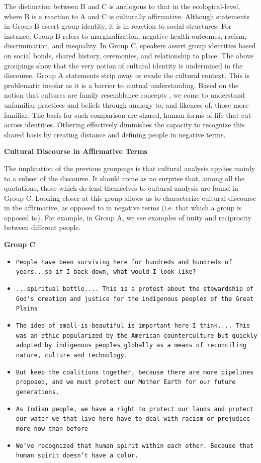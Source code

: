 The distinction between B and C is analogous to that in the ecological-level, where B is a reaction to A and C is culturally affirmative. Although statements in Group B assert group identity, it is in reaction to social structures. For instance, Group B refers to marginalization, negative health outcomes, racism, discrimination, and inequality. In Group C, speakers assert group identities based on social bonds, shared history, ceremonies, and relationship to place. 
The above groupings show that the very notion of cultural identity is undermined in the discourse. Group A statements strip away or evade the cultural context. This is problematic insofar as it is a barrier to mutual understanding. Based on the notion that cultures are family resemblance concepts \citep[10-11]{Frayne2017a}, we come to understand unfamiliar practices and beliefs through analogy to, and likeness of, those more familiar. The basis for such comparison are shared, human forms of life that cut across identities. Othering effectively diminishes the capacity to recognize this shared basis by creating distance and defining people in negative terms. 

\textbf{Cultural Discourse in Affirmative Terms }

The implication of the previous groupings is that cultural analysis applies mainly to a subset of the discourse. It should come as no surprise that, among all the quotations, those which do lend themselves to cultural analysis are found in Group C. Looking closer at this group allows us to characterize cultural discourse in the affirmative, as opposed to in negative terms (i.e. that which a group is opposed to). For example, in Group A, we see examples of unity and reciprocity between different people. 

\begin{footnotesize}
\textbf{Group C}
\begin{itemize}
\item[-] \texttt{People have been surviving here for hundreds and hundreds of years...so if I back down, what would I look like?}
\item[-] \texttt{...spiritual battle.... This is a protest about the stewardship of God's creation and justice for the indigenous peoples of the Great Plains}
\item[-] \texttt{The idea of small-is-beautiful is important here I think.... This was an ethic popularized by the American counterculture but quickly adopted by indigenous peoples globally as a means of reconciling nature, culture and technology.}
\item[-] \texttt{But keep the coalitions together, because there are more pipelines proposed, and we must protect our Mother Earth for our future generations.}
\item[-] \texttt{As Indian people, we have a right to protect our lands and protect our water we that live here have to deal with racism or prejudice more now than before}
\item[-] \texttt{We've recognized that human spirit within each other. Because that human spirit doesn't have a color.}
\end{itemize}
\end{footnotesize}

